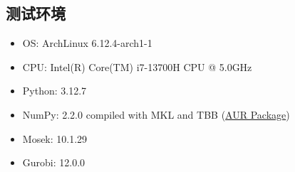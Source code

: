 \documentclass{article}
\begin{document}
\subsection{测试环境}

\begin{itemize}
    \item OS: ArchLinux 6.12.4-arch1-1
    \item CPU: Intel(R) Core(TM) i7-13700H CPU @ 5.0GHz
    \item Python: 3.12.7
    \item NumPy: 2.2.0 compiled with MKL and TBB (\href{https://aur.archlinux.org/packages/python-numpy-mkl-tbb}{AUR Package})
    \item Mosek: 10.1.29
    \item Gurobi: 12.0.0
\end{itemize}
\end{document}
